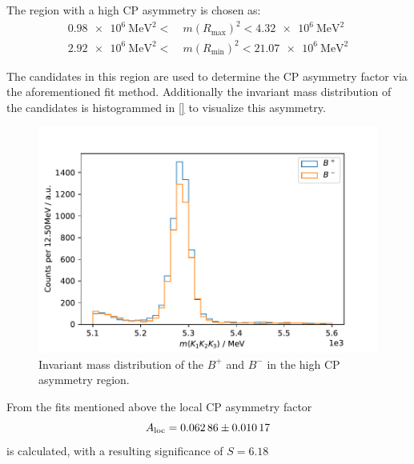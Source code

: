 The region with a high CP asymmetry is chosen as:
\begin{align*}
	\qty{0.98e6}{\mega\eV\tothe{2}} <\ &m(R_\mathrm{max})^2<\qty{4.32e6}{\mega\eV\tothe{2}}\\ \qty{2.92e6}{\mega\eV\tothe{2}} <\ &m(R_\mathrm{min})^2<\qty{21.07e6}{\mega\eV\tothe{2}}
\end{align*}

The candidates in this region are used to determine the CP asymmetry factor via the aforementioned fit method. Additionally the invariant mass distribution of the candidates is histogrammed in \autoref{} to visualize this asymmetry.

\begin{figure}
	\centering
	\includegraphics[width=0.6\linewidth]{content/pictures/image_fin/invmassLocAlt}
	\caption{Invariant mass distribution of the $B^+$ and $B^-$ in the high CP asymmetry region.}
	\label{fig:invmasslocalt}
\end{figure}

From the fits mentioned above the local CP asymmetry factor
\begin{equation}
	A_\mathrm{loc} = \num{0.06286\pm0.01017}
\end{equation}
is calculated, with a resulting significance of $S = 6.18$



